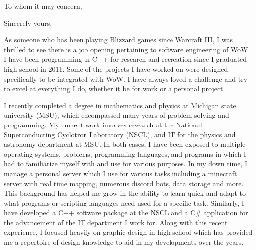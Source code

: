 \documentclass[11pt,a4paper,sans]{moderncv} %
\begin{document}
\makecvtitle 



\date{\today} %
\opening{To whom it may concern,} %

\closing{Sincerely yours,} %

\makelettertitle %

\hspace{1cm} As someone who has been playing Blizzard games since Warcraft III, I was thrilled to see there is a job opening pertaining to software engineering of WoW. I have been programming in C++ for research and recreation since I graduated high school in 2011. Some of the projects I have worked on were designed specifically to be integrated with WoW. I have always loved a challenge and try to excel at everything I do, whether it be for work or a personal project. 

\hspace{1cm} I recently completed a degree in mathematics and physics at Michigan state university (MSU), which encompassed many years of problem solving and programming. My current work involves research at the National Superconducting Cyclotron Laboratory (NSCL), and IT for the physics and astronomy department at MSU. In both cases, I have been exposed to multiple operating systems, problems, programming languages, and programs in which I had to familiarize myself with and use for various purposes. In my down time, I manage a personal server which I use for various tasks including a minecraft server with real time mapping, numerous discord bots, data storage and more. This background has helped me grow in the ability to learn quick and adapt to what programs or scripting languages need used for a specific task. Similarly, I have developed a C++ software package at the NSCL and a C\# application for the advancement of the IT department I work for. Along with this recent experience, I focused heavily on graphic design in high school which has provided me a repertoire of design knowledge to aid in my developments over the years.
\end{document}
